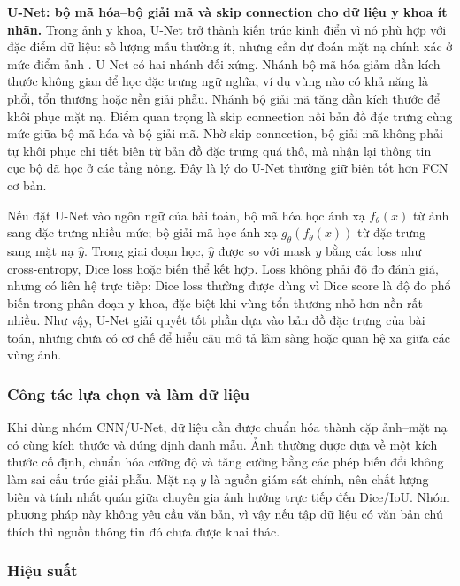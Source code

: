 \textbf{U-Net: bộ mã hóa--bộ giải mã và skip connection cho dữ liệu y khoa ít nhãn.} Trong ảnh y khoa, U-Net trở thành kiến trúc kinh điển vì nó phù hợp với đặc điểm dữ liệu: số lượng mẫu thường ít, nhưng cần dự đoán mặt nạ chính xác ở mức điểm ảnh \cite{ronneberger2015unet}. U-Net có hai nhánh đối xứng. Nhánh bộ mã hóa giảm dần kích thước không gian để học đặc trưng ngữ nghĩa, ví dụ vùng nào có khả năng là phổi, tổn thương hoặc nền giải phẫu. Nhánh bộ giải mã tăng dần kích thước để khôi phục mặt nạ. Điểm quan trọng là skip connection nối bản đồ đặc trưng cùng mức giữa bộ mã hóa và bộ giải mã. Nhờ skip connection, bộ giải mã không phải tự khôi phục chi tiết biên từ bản đồ đặc trưng quá thô, mà nhận lại thông tin cục bộ đã học ở các tầng nông. Đây là lý do U-Net thường giữ biên tốt hơn FCN cơ bản.

Nếu đặt U-Net vào ngôn ngữ của bài toán, bộ mã hóa học ánh xạ \(f_\theta(x)\) từ ảnh sang đặc trưng nhiều mức; bộ giải mã học ánh xạ \(g_\theta(f_\theta(x))\) từ đặc trưng sang mặt nạ \(\hat{y}\). Trong giai đoạn học, \(\hat{y}\) được so với mask \(y\) bằng các loss như cross-entropy, Dice loss hoặc biến thể kết hợp. Loss không phải độ đo đánh giá, nhưng có liên hệ trực tiếp: Dice loss thường được dùng vì Dice score là độ đo phổ biến trong phân đoạn y khoa, đặc biệt khi vùng tổn thương nhỏ hơn nền rất nhiều. Như vậy, U-Net giải quyết tốt phần dựa vào bản đồ đặc trưng của bài toán, nhưng chưa có cơ chế để hiểu câu mô tả lâm sàng hoặc quan hệ xa giữa các vùng ảnh.

\subsubsection{Công tác lựa chọn và làm dữ liệu}

Khi dùng nhóm CNN/U-Net, dữ liệu cần được chuẩn hóa thành cặp ảnh--mặt nạ có cùng kích thước và đúng định danh mẫu. Ảnh thường được đưa về một kích thước cố định, chuẩn hóa cường độ và tăng cường bằng các phép biến đổi không làm sai cấu trúc giải phẫu. Mặt nạ \(y\) là nguồn giám sát chính, nên chất lượng biên và tính nhất quán giữa chuyên gia ảnh hưởng trực tiếp đến Dice/IoU. Nhóm phương pháp này không yêu cầu văn bản, vì vậy nếu tập dữ liệu có văn bản chú thích thì nguồn thông tin đó chưa được khai thác.

\subsubsection{Hiệu suất}

